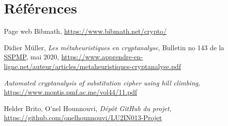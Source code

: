 \documentclass[a4paper]{article}
\begin{document}
\clearpage
{}\label{sec:annexes}
\section*{Références}

\begin{enumerate}[label={[\arabic*]}]
    \item Page web Bibmath, \url{https://www.bibmath.net/crypto/}
    \item Didier Müller, \textit{Les métaheuristiques en cryptanalyse},  Bulletin no 143 de la \href{https://www.vsmp.ch/}{SSPMP}, mai 2020, \url{https://www.apprendre-en-ligne.net/auteur/articles/metaheuristiques-cryptanalyse.pdf}
    \item \textit{Automated cryptanalysis of substitution cipher using hill climbing}, \url{https://www.montis.pmf.ac.me/vol44/11.pdf}
    \item Helder Brito, O'nel Hounnouvi, \textit{Dépôt GitHub du projet}, \url{https://github.com/onelhounnouvi/LU2IN013-Projet}
\end{enumerate}
\end{document}

